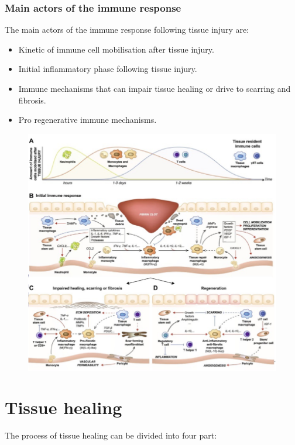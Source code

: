 		\subsubsection{Main actors of the immune response}
		The main actors of the immune response following tissue injury are:

		\begin{multicols}{2}
			\begin{itemize}
				\item Kinetic of immune cell mobilisation after tissue injury.
				\item Initial inflammatory phase following tissue injury.
				\item Immune mechanisms that can impair tissue healing or drive to scarring and fibrosis.
				\item Pro regenerative immune mechanisms.
			\end{itemize}
		\end{multicols}

		\begin{figure}[ht]
			\includegraphics[width=1\textwidth]{healing}
			\caption{\label{fig:healing}}
		\end{figure}

\section{Tissue healing}
The process of tissue healing can be divided into four part:

